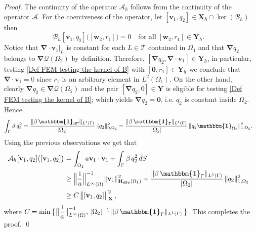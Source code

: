 \documentclass[3p]{elsarticle}
\def\A{{\mathcal A}}
\def\B{{\mathcal B}}
\def\X{\mathbf X}
\def\Y{\mathbf Y}
\def\div{\bm{\nabla} \cdot}
\def\grad{\bm{\nabla}}
\def\Hdiv{\mathbf{H_{div}}}
\def\wtwo{\mathbf{w}_{2}}
\def\vone{\mathbf{v}_{1}}
\def\qtwo{q_{2}}
\def\rone{r_{1}}
\def\triang{\mathcal{T}}
\def\ind{\boldsymbol{\mathbbm{1}}}
\begin{document}
%
%
\begin{proof} The continuity of the operator $\A_{h}$ follows from the continuity of the operator $\A$. For the coerciveness of the operator, let $[\vone, \qtwo]\in \X_{h}\cap \ker(\B_{h})$ then 
   \begin{equation}\label{Def FEM testing the kernel of B}
      \B_{h}[\vone, \qtwo]\big([\wtwo, \rone]\big) = 0 \quad \text{for all}\; [\wtwo, \rone]\in \Y_{h} .
   \end{equation}
%
Notice that $\div\vone\vert_{L}$ is constant for each $L\in \triang$ contained in $\Omega_{1}$ and that $\grad \qtwo$ belongs to $\grad \mathcal{Q}(\Omega_{2})$ by definition. Therefore, $[\grad \qtwo, \div\vone] \in \Y_{h}$, in particular, testing \eqref{Def FEM testing the kernel of B} with $[\bm{0}, \rone]\in \Y_{h}$ we conclude that $\div \vone = 0$ since $\rone$ is an arbitrary element in $L^{2}(\Omega_{1})$. On the other hand, clearly $\grad \qtwo \in \grad \mathcal{Q}(\Omega_{2})$ and the pair $[\grad \qtwo, 0]\in \Y$ is eligible for testing \eqref{Def FEM testing the kernel of B}; which yields $\grad\qtwo = \bm{0}$, i.e. $\qtwo$ is constant inside $\Omega_{2}$. Hence 
%
\begin{equation*}
   \int_{\Gamma} \beta \, \qtwo^{2} = 
   \frac{\Vert \beta \, \ind_{\partial \Gamma}\Vert_{L^{1}(\Gamma)}}{\vert  \Omega_{2} \vert} \, 
   \Vert \qtwo \Vert_{0, \Omega_{2}}^{2} 
   = \frac{\Vert \beta \, \ind_{\Gamma}\Vert_{L^{1}(\Gamma)}}{\vert  \Omega_{2} \vert} \, 
   \Vert \qtwo \ind_{\Omega_{2}} \Vert_{1, \Omega_{2}}^{2} .
\end{equation*}
%
Using the previous observations we get that
%
\begin{equation*}
\begin{split}
\A_{h}[\vone, \qtwo] \big([\vone, \qtwo]\big) & = 
\int_{\Omega_1}  a\vone \cdot \vone 
+ \int_{\Gamma}  \beta \, \qtwo^{2}  \, dS \\
%
& \geq
\Big\Vert\frac{1}{a} \Big\Vert^{-1}_{L^{\infty}(\Omega)}\Vert \vone \Vert^{2}_{\Hdiv(\Omega_{1} ) } 
+ \frac{\Vert \beta \, \ind_{\Gamma}\Vert_{L^{1}(\Gamma)}}{\vert  \Omega_{2} \vert} \, 
   \Vert \qtwo  \Vert_{1, \Omega_{2} }^{2} \\
 &  \geq C \, \big\Vert [\vone, \qtwo]\big\Vert_{\X}^{2} \, ,
   \end{split}
\end{equation*}
%
where $C = \min \big\{\big\Vert\dfrac{1}{a} \big\Vert^{-1}_{L^{\infty}(\Omega)}, \, 
\vert  \Omega_{2} \vert^{-1}\, \Vert \beta \, \ind_{\Gamma}\Vert_{L^{1}(\Gamma)} \,  \big\}$. This completes the proof. 
%
\qed
\end{proof}
\end{document}
